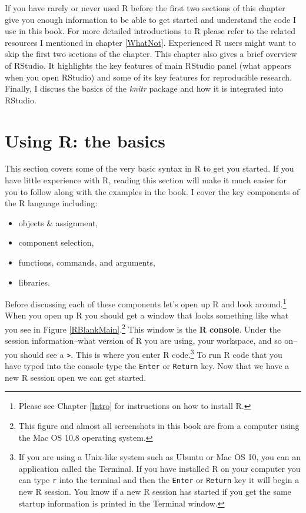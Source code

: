 \documentclass[ChapterTOCs,krantz1]{krantz}\usepackage{graphicx, color}
\begin{document}
If you have rarely or never used R before the first two sections of this chapter give you enough information to be able to get started and understand the code I use in this book. For more detailed introductions to R please refer to the related resources I mentioned in chapter \ref{WhatNot}. Experienced R users might want to skip the first two sections of the chapter. This chapter also gives a brief overview of RStudio. It highlights the key features of main RStudio panel (what appears when you open RStudio) and some of its key features for reproducible research. Finally, I discuss the basics of the {\emph{knitr}} package and how it is integrated into RStudio.

\section{Using R: the basics}

This section covers some of the very basic syntax in R to get you started. If you have little experience with R, reading this section will make it much easier for you to follow along with the examples in the book. I cover the key components of the R language including:

\begin{itemize}
    \item objects \& assignment,
    \item component selection,
    \item functions, commands, and arguments,
    \item libraries.
\end{itemize}

Before discussing each of these components let's open up R and look around.\footnote{Please see Chapter \ref{Intro} for instructions on how to install R.} When you open up R you should get a window that looks something like what you see in Figure \ref{RBlankMain}.\footnote{This figure and almost all screenshots in this book are from a computer using the Mac OS 10.8 operating system.} This window is the {\bf{R console}}. Under the session information--what version of R you are using, your workspace, and so on--you should see a {\tt{\textgreater}}. This is where you enter R code.\footnote{If you are using a Unix-like system such as Ubuntu or Mac OS 10, you can an application called the Terminal. If you have installed R on your computer you can type {\tt{r}} into the terminal and then the {\tt{Enter}} or {\tt{Return}} key it will begin a new R session. You know if a new R session has started if you get the same startup information is printed in the Terminal window.} To run R code that you have typed into the console type the {\tt{Enter}} or {\tt{Return}} key. Now that we have a new R session open we can get started. 
\end{document}
